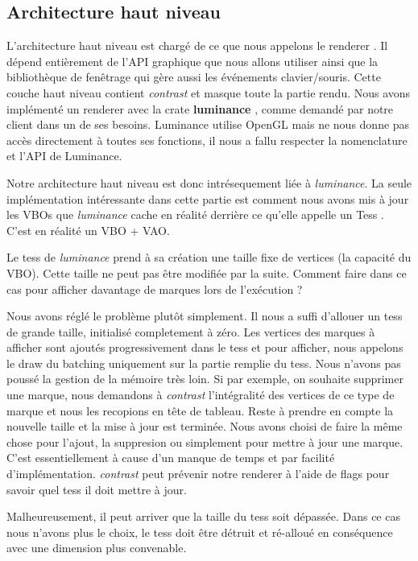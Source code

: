 \documentclass[12pt]{article}
\begin{document}
\subsection{Architecture haut niveau}

L'architecture haut niveau est chargé de ce que nous appelons le \og renderer \fg{}. Il dépend entièrement de l'API graphique que nous allons utiliser ainsi que la bibliothèque
de fenêtrage qui gère aussi les événements clavier/souris. Cette couche haut niveau contient \textit{contrast} et masque toute la partie rendu.
Nous avons implémenté un renderer avec la crate \textbf{luminance} \cite{luminance}, comme demandé par notre client dans un de ses besoins.
Luminance utilise OpenGL mais ne nous donne pas accès directement à toutes ses fonctions, il nous a fallu respecter la nomenclature et l'API de Luminance.

Notre architecture haut niveau est donc intrésequement liée à \textit{luminance}. La seule implémentation intéressante dans cette partie est comment nous avons mis à jour les VBOs que \textit{luminance} cache
en réalité derrière ce qu'elle appelle un \og Tess \fg{}. C'est en réalité un VBO + VAO.

Le tess de \textit{luminance} prend à sa création une taille fixe de vertices (la capacité du VBO). Cette taille ne peut pas être modifiée par la suite. Comment faire dans ce cas pour afficher davantage
de marques lors de l'exécution ?

Nous avons réglé le problème plutôt simplement. Il nous a suffi d'allouer un tess de grande taille, initialisé completement à zéro. Les vertices des marques à afficher sont ajoutés
progressivement dans le tess et pour afficher, nous appelons le \og draw \fg{} du batching uniquement sur la partie remplie du tess. Nous n'avons pas poussé la gestion de la mémoire très loin.
Si par exemple, on souhaite supprimer une marque, nous demandons à \textit{contrast} l'intégralité des vertices de ce type de marque et nous les recopions en tête de tableau. Reste à prendre en compte la
nouvelle taille et la mise à jour est terminée. Nous avons choisi de faire la même chose pour l'ajout, la suppresion ou simplement pour mettre à jour une marque. C'est essentiellement à cause d'un
manque de temps et par facilité d'implémentation. \textit{contrast} peut prévenir notre renderer à l'aide de flags pour savoir quel tess il doit mettre à jour.

Malheureusement, il peut arriver que la taille du tess soit dépassée. Dans ce cas nous n'avons plus le choix, le tess doit être détruit et ré-alloué en conséquence avec une dimension plus convenable.
\end{document}
